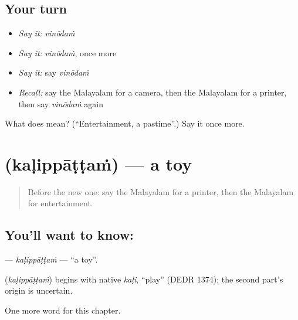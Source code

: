 \subsection*{Your turn}
\begin{itemize}
\raggedright
  \item \emph{Say it:} \emph{vinōdaṁ}
  \item \emph{Say it:} \emph{vinōdaṁ}, once more
  \item \emph{Say it:} say \emph{vinōdaṁ}
  \item \emph{Recall:} say the Malayalam for a camera, then the Malayalam for a printer, then say \emph{vinōdaṁ} again
\end{itemize}

\begin{tcolorbox}[breakable,colback=teal!4,colframe=teal!35!black,title={Before you move on}]
What does  mean? (\textquotedblleft{}Entertainment, a pastime\textquotedblright{}.) Say it once more.
\end{tcolorbox}
\section[\texorpdfstring{\ml{കളിപ്പാട്ടം} (kaḷippāṭṭaṁ)}{കളിപ്പാട്ടം (kaḷippāṭṭaṁ)}]{ (kaḷippāṭṭaṁ) — a toy}

\label{lesson:ML-C256-kalippattam}



\begin{quote}
Before the new one: say the Malayalam for a printer, then the Malayalam for entertainment.
\end{quote}

\subsection*{You'll want to know: }
\textbf{} — \emph{kaḷippāṭṭaṁ} — \textquotedblleft{}a toy\textquotedblright{}.

\begin{cousinweb}
\textbf{} (\emph{kaḷippāṭṭaṁ}) begins with native \emph{kaḷi}, \textquotedblleft{}play\textquotedblright{} (DEDR 1374); the second part's origin is uncertain.
\end{cousinweb}

\begin{grammarlens}[title={What you've built}]
One more word for this chapter.
\end{grammarlens}


